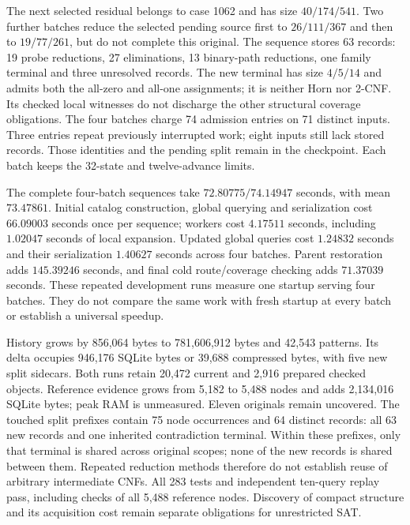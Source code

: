 \documentclass[11pt,a4paper]{article}
\numberwithin{equation}{section}
\theoremstyle{plain}
\theoremstyle{definition}
\theoremstyle{remark}
\begin{document}
The next selected residual belongs to case 1062 and has size $40/174/541$.
Two further batches reduce the selected pending source first to $26/111/367$
and then to $19/77/261$, but do not complete this original. The sequence stores
63 records: 19 probe reductions, 27 eliminations, 13 binary-path reductions,
one family terminal and three unresolved records. The new terminal has size
$4/5/14$ and admits both the all-zero and all-one assignments; it is neither
Horn nor 2-CNF. Its checked local witnesses do not discharge the other structural
coverage obligations. The four batches charge 74 admission entries on 71 distinct
inputs. Three entries repeat previously interrupted work; eight inputs still
lack stored records. Those identities and the pending split remain in the
checkpoint. Each batch keeps the 32-state and twelve-advance limits.

The complete four-batch sequences take $72.80775/74.14947$ seconds, with mean
$73.47861$. Initial catalog construction, global querying and serialization
cost $66.09003$ seconds once per sequence; workers cost $4.17511$ seconds,
including $1.02047$ seconds of local expansion. Updated global queries cost
$1.24832$ seconds and their serialization $1.40627$ seconds across four batches.
Parent restoration adds $145.39246$ seconds, and final cold route/coverage
checking adds $71.37039$ seconds. These repeated development runs measure one
startup serving four batches. They do not compare the same work with fresh
startup at every batch or establish a universal speedup.

History grows by 856,064 bytes to 781,606,912 bytes and 42,543 patterns. Its
delta occupies 946,176 SQLite bytes or 39,688 compressed bytes, with five new
split sidecars. Both runs retain 20,472 current and 2,916 prepared checked
objects. Reference evidence grows from 5,182 to 5,488 nodes and adds 2,134,016
SQLite bytes; peak RAM is unmeasured. Eleven originals remain uncovered.
The touched split prefixes contain 75 node occurrences and 64 distinct records:
all 63 new records and one inherited contradiction terminal. Within these prefixes, only that terminal
is shared across original scopes; none of the new records is shared between them.
Repeated reduction methods therefore do not establish reuse of arbitrary
intermediate CNFs. All 283 tests and independent ten-query replay pass, including
checks of all 5,488 reference nodes. Discovery of compact structure and its
acquisition cost remain separate obligations for unrestricted SAT.
\end{document}

